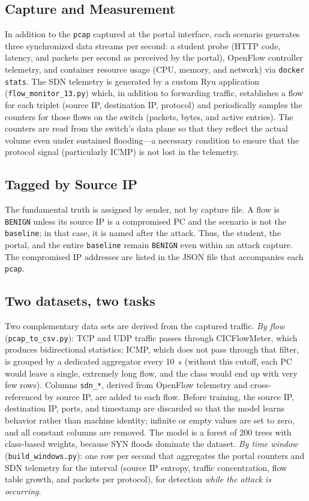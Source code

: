 \documentclass[ASNA,twocolumn]{USG}
\begin{document}
  \subsection{Capture and Measurement}

  In addition to the \texttt{pcap} captured at the portal interface, each scenario generates three synchronized data streams per second: a student probe (HTTP code, latency, and packets per second as perceived by the portal), OpenFlow controller telemetry, and container resource usage (CPU, memory, and network) via \texttt{docker stats}. The SDN telemetry is generated by a custom Ryu application (\texttt{flow\_monitor\_13.py}) which, in addition to forwarding traffic, establishes a flow for each triplet (source IP, destination IP, protocol) and periodically samples the counters for those flows on the switch (packets, bytes, and active entries). The counters are read from the switch’s data plane so that they reflect the actual volume even under sustained flooding—a necessary condition to ensure that the protocol signal (particularly ICMP) is not lost in the telemetry.

  \subsection{Tagged by Source IP}
  The fundamental truth is assigned by sender, not by capture file. A flow is \texttt{BENIGN} unless its source IP is a compromised PC and the scenario is not the \texttt{baseline}; in that case, it is named after the attack. Thus, the student, the portal, and the entire \texttt{baseline} remain \texttt{BENIGN} even within an attack capture. The compromised IP addresses are listed in the JSON file that accompanies each \texttt{pcap}.

  \subsection{Two datasets, two tasks}

  Two complementary data sets are derived from the captured traffic. \emph{By flow} (\texttt{pcap\_to\_csv.py}): TCP and UDP traffic passes through CICFlowMeter, which produces bidirectional statistics; ICMP, which does not pass through that filter, is grouped by a dedicated aggregator every 10~s (without this cutoff, each PC would leave a single, extremely long flow, and the class would end up with very few rows). Columns \texttt{sdn\_*}, derived from OpenFlow telemetry and cross-referenced by source IP, are added to each flow. Before training, the source IP, destination IP, ports, and timestamp are discarded so that the model learns behavior rather than machine identity; infinite or empty values are set to zero, and all constant columns are removed. The model is a forest of 200 trees with class-based weights, because SYN floods dominate the dataset. \emph{By time window} (\texttt{build\_windows.py}): one row per second that aggregates the portal counters and SDN telemetry for the interval (source IP entropy, traffic concentration, flow table growth, and packets per protocol), for detection \emph{while the attack is occurring}.
\end{document}
